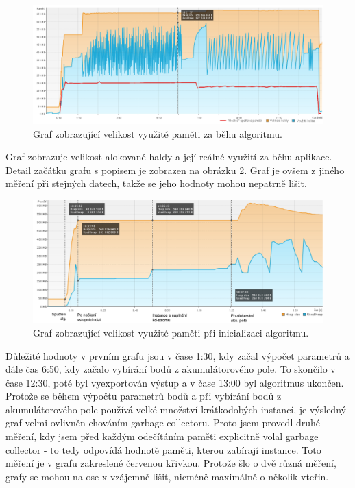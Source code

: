 \documentclass[11pt,twoside,a4paper]{book}
\begin{document}
\begin{figure}[ht]
\begin{center}
\includegraphics[width=\textwidth]{figures/memory-graph-all}
\caption{Graf zobrazující velikost využité paměti za běhu algoritmu.}
\label{fig:memory-graph-all}
\end{center}
\end{figure}

Graf zobrazuje velikost alokované haldy a její reálné využití za běhu aplikace. Detail začátku grafu s popisem je zobrazen na obrázku \ref{fig:memory-graf1}. Graf je ovšem z jiného měření při stejných datech, takže se jeho hodnoty mohou nepatrně lišit. 

\begin{figure}[ht]
\begin{center}
\includegraphics[width=\textwidth]{figures/memory-graf1}
\caption{Graf zobrazující velikost využité paměti při inicializaci algoritmu.}
\label{fig:memory-graf1}
\end{center}
\end{figure}

Důležité hodnoty v prvním grafu jsou v čase 1:30, kdy začal výpočet parametrů a dále čas 6:50, kdy začalo vybírání bodů z akumulátorového pole. To skončilo v čase 12:30, poté byl vyexportován výstup a v čase 13:00 byl algoritmus ukončen. Protože se během výpočtu parametrů bodů a při vybírání bodů z akumulátorového pole používá velké množství krátkodobých instancí, je výsledný graf velmi ovlivněn chováním garbage collectoru. Proto jsem provedl druhé měření, kdy jsem před každým odečítáním paměti explicitně volal garbage collector - to tedy odpovídá hodnotě paměti, kterou zabírají  instance. Toto měření je v grafu zakreslené červenou křivkou. Protože šlo o dvě různá měření, grafy se mohou na ose x vzájemně lišit, nicméně maximálně o několik vteřin.
\end{document}
